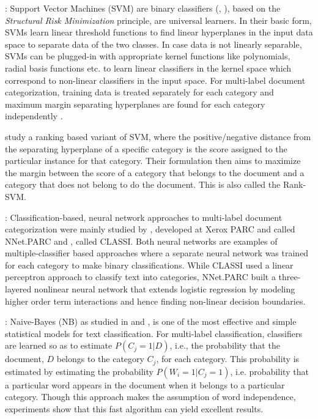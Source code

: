  : Support Vector Machines (SVM) are
binary classifiers (\citep{cortes1995support}, \citep{vapnik2000nature}), 
based on the \emph{Structural Risk Minimization} principle, are universal learners. In their basic form, SVMs learn linear threshold functions to find 
linear hyperplanes in the input data space to separate data of the two 
classes. In case data is not linearly separable, 
SVMs can be plugged-in with appropriate kernel functions like polynomials,
radial basis functions etc. to learn linear classifiers in the kernel space
which correspond to non-linear classifiers in the input space.
For multi-label document categorization, training data is treated 
separately for each category and maximum margin separating hyperplanes 
are found for each category independently \citep{joachims1998text}.

\citet{elisseeff2001kernel} study a ranking based variant of SVM, where the positive/negative distance from the separating hyperplane of a specific category is the score assigned to the particular instance for that category. Their formulation then aims to maximize the margin between the score of a category that belongs to the document and a category that does not belong to do the document. This is also called the Rank-SVM.

 : Classification-based, neural network 
approaches to multi-label document categorization were mainly studied 
by \citet{wiener1995neural}, developed at Xerox PARC and called NNet.PARC
and \citet{ng1997feature}, called CLASSI. Both neural networks are 
examples of multiple-classifier based approaches where a separate 
neural network was trained for each category to make binary 
classifications. While CLASSI used a linear perceptron approach to 
classify text into categories, NNet.PARC built a three-layered 
nonlinear neural network that extends logistic regression by modeling 
higher order term interactions and hence finding non-linear decision 
boundaries. 

 : Naive-Bayes (NB) as studied in 
\citet{lewis1992representation} and \citet{lewis1994comparison}, is 
one of the most effective and simple statistical models for text 
classification. For multi-label classification, classifiers are 
learned so as to estimate $P(C_{j}=1|D)$, i.e., the probability that 
the document, $D$ belongs to the category $C_{j}$, for each category. 
This probability is estimated by estimating the probability $P(W_{i}=1|
C_{j}=1)$, i.e. probability that a particular word appears in the 
document when it belongs to a particular category. Though this 
approach makes the assumption of word independence, experiments show 
that this fast algorithm can yield excellent results. 

